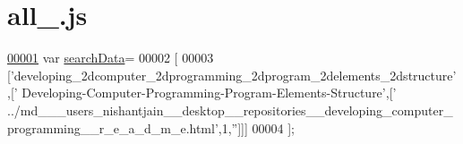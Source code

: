 \hypertarget{all__1_8js_source}{\section{all\+\_.\+js}
\label{all__1_8js_source}
}

\begin{DoxyCode}
\hypertarget{all__1_8js_source_l00001}{}\hyperlink{all__1_8js_ad01a7523f103d6242ef9b0451861231e}{00001} var \hyperlink{all__1_8js_ad01a7523f103d6242ef9b0451861231e}{searchData}=
00002 [
00003   [\textcolor{stringliteral}{'developing\_2dcomputer\_2dprogramming\_2dprogram\_2delements\_2dstructure'},[\textcolor{stringliteral}{'
      Developing-Computer-Programming-Program-Elements-Structure'},[\textcolor{stringliteral}{'
      ../md\_\_\_users\_nishantjain\_\_desktop\_\_repositories\_\_developing\_computer\_programming\_\_r\_e\_a\_d\_m\_e.html'},1,\textcolor{stringliteral}{''}]]]
00004 ];
\end{DoxyCode}
